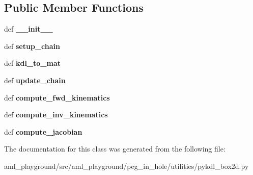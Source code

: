 \subsection*{Public Member Functions}
\begin{DoxyCompactItemize}
\item 
\hypertarget{classaml__playground_1_1peg__in__hole_1_1utilities_1_1pykdl__box2d_1_1_py_k_d_l_box2d_a78d5da56b7249d65fccb7953e83add16}{def {\bfseries \-\_\-\-\_\-init\-\_\-\-\_\-}}\label{classaml__playground_1_1peg__in__hole_1_1utilities_1_1pykdl__box2d_1_1_py_k_d_l_box2d_a78d5da56b7249d65fccb7953e83add16}

\item 
\hypertarget{classaml__playground_1_1peg__in__hole_1_1utilities_1_1pykdl__box2d_1_1_py_k_d_l_box2d_a68c0f76c4da54a20bc2c33f04f8a3185}{def {\bfseries setup\-\_\-chain}}\label{classaml__playground_1_1peg__in__hole_1_1utilities_1_1pykdl__box2d_1_1_py_k_d_l_box2d_a68c0f76c4da54a20bc2c33f04f8a3185}

\item 
\hypertarget{classaml__playground_1_1peg__in__hole_1_1utilities_1_1pykdl__box2d_1_1_py_k_d_l_box2d_ab42c4f57ad6c47582c16461dbaffa884}{def {\bfseries kdl\-\_\-to\-\_\-mat}}\label{classaml__playground_1_1peg__in__hole_1_1utilities_1_1pykdl__box2d_1_1_py_k_d_l_box2d_ab42c4f57ad6c47582c16461dbaffa884}

\item 
\hypertarget{classaml__playground_1_1peg__in__hole_1_1utilities_1_1pykdl__box2d_1_1_py_k_d_l_box2d_a1aaa697089b68b742da13f2e60e99ec3}{def {\bfseries update\-\_\-chain}}\label{classaml__playground_1_1peg__in__hole_1_1utilities_1_1pykdl__box2d_1_1_py_k_d_l_box2d_a1aaa697089b68b742da13f2e60e99ec3}

\item 
\hypertarget{classaml__playground_1_1peg__in__hole_1_1utilities_1_1pykdl__box2d_1_1_py_k_d_l_box2d_aa924f95b7fb667d527b1446d38e25eb5}{def {\bfseries compute\-\_\-fwd\-\_\-kinematics}}\label{classaml__playground_1_1peg__in__hole_1_1utilities_1_1pykdl__box2d_1_1_py_k_d_l_box2d_aa924f95b7fb667d527b1446d38e25eb5}

\item 
\hypertarget{classaml__playground_1_1peg__in__hole_1_1utilities_1_1pykdl__box2d_1_1_py_k_d_l_box2d_a11c52e1fb5486173207bd5b3eef84725}{def {\bfseries compute\-\_\-inv\-\_\-kinematics}}\label{classaml__playground_1_1peg__in__hole_1_1utilities_1_1pykdl__box2d_1_1_py_k_d_l_box2d_a11c52e1fb5486173207bd5b3eef84725}

\item 
\hypertarget{classaml__playground_1_1peg__in__hole_1_1utilities_1_1pykdl__box2d_1_1_py_k_d_l_box2d_a12fd821e1c02f157ad476416e6215355}{def {\bfseries compute\-\_\-jacobian}}\label{classaml__playground_1_1peg__in__hole_1_1utilities_1_1pykdl__box2d_1_1_py_k_d_l_box2d_a12fd821e1c02f157ad476416e6215355}

\end{DoxyCompactItemize}


The documentation for this class was generated from the following file\-:\begin{DoxyCompactItemize}
\item 
aml\-\_\-playground/src/aml\-\_\-playground/peg\-\_\-in\-\_\-hole/utilities/pykdl\-\_\-box2d.\-py\end{DoxyCompactItemize}
